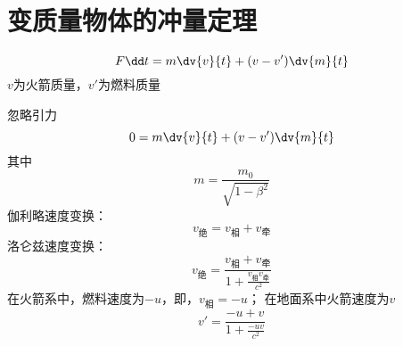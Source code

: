 
\section{变质量物体的冲量定理}%
\begin{equation}
	F \dd t = m \dv{v}{t} + (v - v') \dv{m}{t}
\end{equation}
\(v\)为火箭质量，\(v'\)为燃料质量

忽略引力
\begin{equation*}
0 = m \dv{v}{t} + (v - v') \dv{m}{t}
\end{equation*}
其中
\begin{equation*}
	m = \frac{m_0}{\sqrt{1-\beta^2}}
\end{equation*}
伽利略速度变换：
\begin{equation}
	v_{\text{绝}} =          v_{\text{相}} +         v_{\text{牵}}
\end{equation}
洛仑兹速度变换：
\begin{equation}
	v_{\text{绝}} =          
	\frac{v_{\text{相}} +         v_{\text{牵}}}{1+\frac{v_{\text{相}} v_{\text{牵}}}{c^2}}
\end{equation}
在火箭系中，燃料速度为\(-u\)，即，\(v_{\text{相}}=-u\)；
在地面系中火箭速度为\(v\)
\begin{equation*}
	v' = \frac{-u+v}{1 + \frac{-uv}{c^2}}
\end{equation*}





